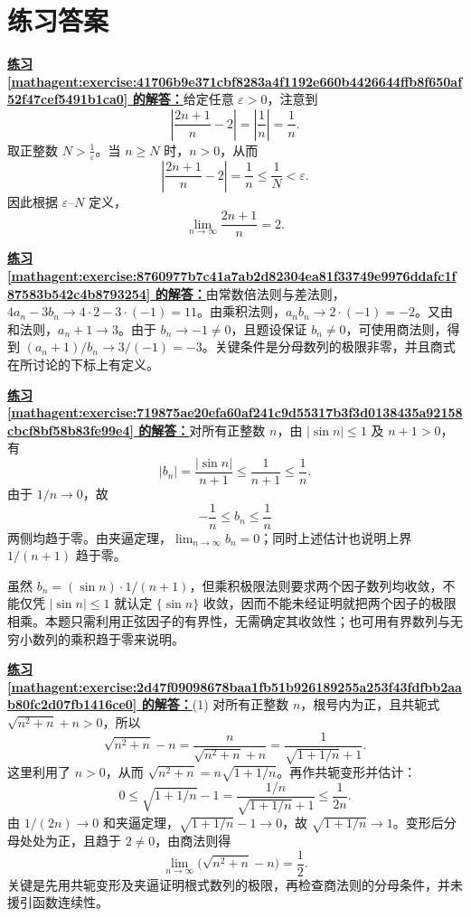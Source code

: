 \documentclass[UTF8,fontset=fandol,11pt]{ctexart}
\begin{document}
\section*{练习答案}
\par\noindent\textbf{\hyperref[mathagent:exercise:41706b9e371cbf8283a4f1192e660b4426644ffb8f650af52f47cef5491b1ca0]{练习 \ref*{mathagent:exercise:41706b9e371cbf8283a4f1192e660b4426644ffb8f650af52f47cef5491b1ca0} 的解答：}}给定任意 $\varepsilon>0$，注意到
\[
\left|\frac{2n+1}{n}-2\right|=\left|\frac{1}{n}\right|=\frac{1}{n}.
\]
取正整数 $N>\frac{1}{\varepsilon}$。当 $n\geq N$ 时，$n>0$，从而
\[
\left|\frac{2n+1}{n}-2\right|=\frac{1}{n}\leq\frac{1}{N}<\varepsilon.
\]
因此根据 $\varepsilon$--$N$ 定义，
\[
\lim_{n\to\infty}\frac{2n+1}{n}=2.
\]\par
\par\noindent\textbf{\hyperref[mathagent:exercise:8760977b7c41a7ab2d82304ea81f33749e9976ddafc1f87583b542c4b8793254]{练习 \ref*{mathagent:exercise:8760977b7c41a7ab2d82304ea81f33749e9976ddafc1f87583b542c4b8793254} 的解答：}}由常数倍法则与差法则，$4a_n-3b_n\to4\cdot2-3\cdot(-1)=11$。由乘积法则，$a_nb_n\to2\cdot(-1)=-2$。又由和法则，$a_n+1\to3$。由于 $b_n\to-1\neq0$，且题设保证 $b_n\neq0$，可使用商法则，得到 $(a_n+1)/b_n\to3/(-1)=-3$。关键条件是分母数列的极限非零，并且商式在所讨论的下标上有定义。\par
\par\noindent\textbf{\hyperref[mathagent:exercise:719875ae20efa60af241c9d55317b3f3d0138435a92158cbcf8bf58b83fe99e4]{练习 \ref*{mathagent:exercise:719875ae20efa60af241c9d55317b3f3d0138435a92158cbcf8bf58b83fe99e4} 的解答：}}对所有正整数 $n$，由 $|\sin n|\leq1$ 及 $n+1>0$，有
\[
|b_n|=\frac{|\sin n|}{n+1}\leq\frac1{n+1}\leq\frac1n.
\]
由于 $1/n\to0$，故
\[
-\frac1n\leq b_n\leq\frac1n
\]
两侧均趋于零。由夹逼定理，$\displaystyle\lim_{n\to\infty}b_n=0$；同时上述估计也说明上界 $1/(n+1)$ 趋于零。

虽然 $b_n=(\sin n)\cdot1/(n+1)$，但乘积极限法则要求两个因子数列均收敛，不能仅凭 $|\sin n|\leq1$ 就认定 $\{\sin n\}$ 收敛，因而不能未经证明就把两个因子的极限相乘。本题只需利用正弦因子的有界性，无需确定其收敛性；也可用有界数列与无穷小数列的乘积趋于零来说明。\par
\par\noindent\textbf{\hyperref[mathagent:exercise:2d47f09098678baa1fb51b926189255a253f43fdfbb2aab80fc2d07fb1416ce0]{练习 \ref*{mathagent:exercise:2d47f09098678baa1fb51b926189255a253f43fdfbb2aab80fc2d07fb1416ce0} 的解答：}}(1) 对所有正整数 $n$，根号内为正，且共轭式 $\sqrt{n^2+n}+n>0$，所以
\[
\sqrt{n^2+n}-n
=\frac{n}{\sqrt{n^2+n}+n}
=\frac1{\sqrt{1+1/n}+1}.
\]
这里利用了 $n>0$，从而 $\sqrt{n^2+n}=n\sqrt{1+1/n}$。再作共轭变形并估计：
\[
0\leq\sqrt{1+1/n}-1
=\frac{1/n}{\sqrt{1+1/n}+1}
\leq\frac1{2n}.
\]
由 $1/(2n)\to0$ 和夹逼定理，$\sqrt{1+1/n}-1\to0$，故 $\sqrt{1+1/n}\to1$。变形后分母处处为正，且趋于 $2\neq0$，由商法则得
\[
\lim_{n\to\infty}\bigl(\sqrt{n^2+n}-n\bigr)=\frac12.
\]
关键是先用共轭变形及夹逼证明根式数列的极限，再检查商法则的分母条件，并未援引函数连续性。
\end{document}
